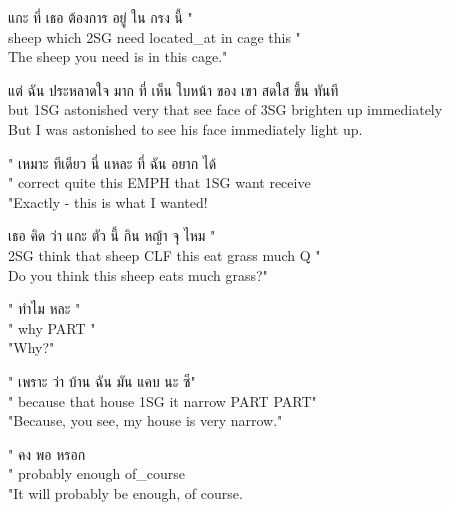 \documentclass{book}
\begin{document}
	\begin{exe}
		\ex 
		\gll แกะ ที่ เธอ ต้องการ อยู่ ใน กรง นี้ "\\
		sheep which \textsc{2SG} need located\_at in cage this "\\
		The sheep you need is in this cage."
	\end{exe}

	\begin{exe}
		\ex 
		\gll แต่ ฉัน ประหลาดใจ มาก ที่ เห็น ใบหน้า ของ เขา สดใส ขึ้น ทันที\\
		but \textsc{1SG} astonished very that see face of \textsc{3SG} brighten up immediately\\
		But I was astonished to see his face immediately light up.
	\end{exe}

	\begin{exe}
		\ex 
		\gll " เหมาะ ทีเดียว นี่ แหละ ที่ ฉัน อยาก ได้\\
		" correct quite this \textsc{EMPH} that \textsc{1SG} want receive\\
		"Exactly - this is what I wanted!
	\end{exe}

	\begin{exe}
		\ex 
		\gll เธอ คิด ว่า แกะ ตัว นี้ กิน หญ้า จุ ไหม "\\
		\textsc{2SG} think that sheep \textsc{CLF} this eat grass much \textsc{Q} "\\
		Do you think this sheep eats much grass?"
	\end{exe}

	\begin{exe}
		\ex 
		\gll " ทำไม หละ "\\
		" why \textsc{PART} "\\
		"Why?"
	\end{exe}

	\begin{exe}
		\ex 
		\gll " เพราะ ว่า บ้าน ฉัน มัน แคบ นะ ซี"\\
		" because that house \textsc{1SG} it narrow \textsc{PART} \textsc{PART}"\\
		"Because, you see, my house is very narrow."
	\end{exe}

	\begin{exe}
		\ex 
		\gll " คง พอ หรอก\\
		" probably enough of\_course\\
		"It will probably be enough, of course.
	\end{exe}
\end{document}
